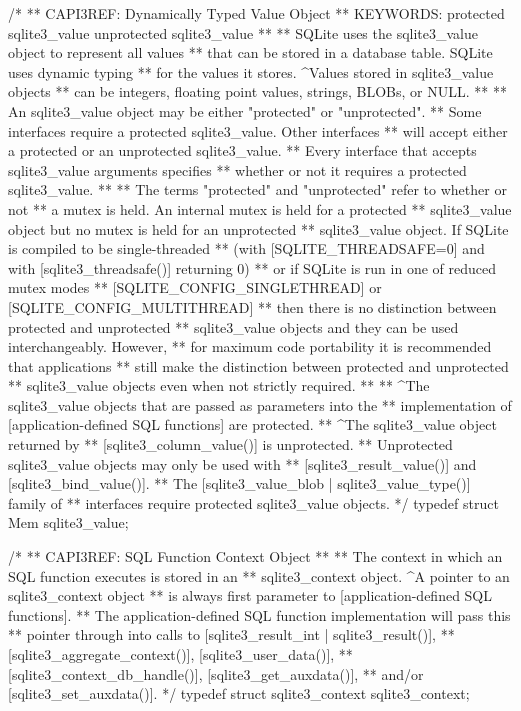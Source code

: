 \begin{Codex}[label=sqlite3.h,numbers=left]
{/*
** CAPI3REF: Dynamically Typed Value Object
** KEYWORDS: {protected sqlite3_value} {unprotected sqlite3_value}
**
** SQLite uses the sqlite3_value object to represent all values
** that can be stored in a database table. SQLite uses dynamic typing
** for the values it stores.  ^Values stored in sqlite3_value objects
** can be integers, floating point values, strings, BLOBs, or NULL.
**
** An sqlite3_value object may be either "protected" or "unprotected".
** Some interfaces require a protected sqlite3_value.  Other interfaces
** will accept either a protected or an unprotected sqlite3_value.
** Every interface that accepts sqlite3_value arguments specifies
** whether or not it requires a protected sqlite3_value.
**
** The terms "protected" and "unprotected" refer to whether or not
** a mutex is held.  An internal mutex is held for a protected
** sqlite3_value object but no mutex is held for an unprotected
** sqlite3_value object.  If SQLite is compiled to be single-threaded
** (with [SQLITE_THREADSAFE=0] and with [sqlite3_threadsafe()] returning 0)
** or if SQLite is run in one of reduced mutex modes 
** [SQLITE_CONFIG_SINGLETHREAD] or [SQLITE_CONFIG_MULTITHREAD]
** then there is no distinction between protected and unprotected
** sqlite3_value objects and they can be used interchangeably.  However,
** for maximum code portability it is recommended that applications
** still make the distinction between protected and unprotected
** sqlite3_value objects even when not strictly required.
**
** ^The sqlite3_value objects that are passed as parameters into the
** implementation of [application-defined SQL functions] are protected.
** ^The sqlite3_value object returned by
** [sqlite3_column_value()] is unprotected.
** Unprotected sqlite3_value objects may only be used with
** [sqlite3_result_value()] and [sqlite3_bind_value()].
** The [sqlite3_value_blob | sqlite3_value_type()] family of
** interfaces require protected sqlite3_value objects.
*/
typedef struct Mem sqlite3_value;

/*
** CAPI3REF: SQL Function Context Object
**
** The context in which an SQL function executes is stored in an
** sqlite3_context object.  ^A pointer to an sqlite3_context object
** is always first parameter to [application-defined SQL functions].
** The application-defined SQL function implementation will pass this
** pointer through into calls to [sqlite3_result_int | sqlite3_result()],
** [sqlite3_aggregate_context()], [sqlite3_user_data()],
** [sqlite3_context_db_handle()], [sqlite3_get_auxdata()],
** and/or [sqlite3_set_auxdata()].
*/
typedef struct sqlite3_context sqlite3_context;

}
\end{Codex}

